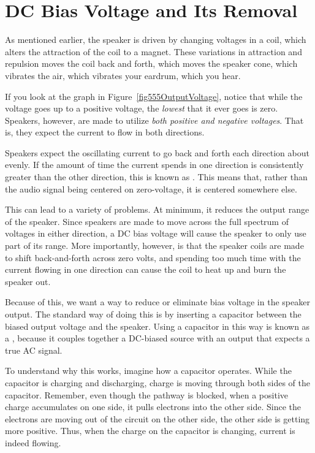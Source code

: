 \section{DC Bias Voltage and Its Removal}

As mentioned earlier, the speaker is driven by changing voltages in a coil, which alters the attraction of the coil to a magnet.
These variations in attraction and repulsion moves the coil back and forth, which moves the speaker cone, which vibrates the air, which vibrates your eardrum, which you hear.

If you look at the graph in Figure~\ref{fig555OutputVoltage}, notice that while the voltage goes up to a positive voltage, the \emph{lowest} that it ever goes is zero.
Speakers, however, are made to utilize \emph{both positive and negative voltages}.
That is, they expect the current to flow in both directions.

Speakers expect the oscillating current to go back and forth each direction about evenly.
If the amount of time the current spends in one direction is consistently greater than the other direction, this is known as .
This means that, rather than the audio signal being centered on zero-voltage, it is centered somewhere else.

This can lead to a variety of problems.
At minimum, it reduces the output range of the speaker.
Since speakers are made to move across the full spectrum of voltages in either direction, a DC bias voltage will cause the speaker to only use part of its range.
More importantly, however, is that the speaker coils are made to shift back-and-forth across zero volts, and spending too much time with the current flowing in one direction can cause the coil to heat up and burn the speaker out.

Because of this, we want a way to reduce or eliminate bias voltage in the speaker output.
The standard way of doing this is by inserting a capacitor between the biased output voltage and the speaker.
Using a capacitor in this way is known as a , because it couples together a DC-biased source with an output that expects a true AC signal.

To understand why this works, imagine how a capacitor operates.
While the capacitor is charging and discharging, charge is moving through both sides of the capacitor.  
Remember, even though the pathway is blocked, when a positive charge accumulates on one side, it pulls electrons into the other side.
Since the electrons are moving out of the circuit on the other side, the other side is getting more positive.
Thus, when the charge on the capacitor is changing, current is indeed flowing.

